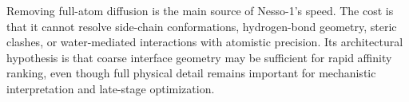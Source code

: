 Removing full-atom diffusion is the main source of Nesso-1's speed. The cost is
that it cannot resolve side-chain conformations, hydrogen-bond geometry,
steric clashes, or water-mediated interactions with atomistic precision. Its
architectural hypothesis is that coarse interface geometry may be sufficient
for rapid affinity ranking, even though full physical detail remains important
for mechanistic interpretation and late-stage optimization.
